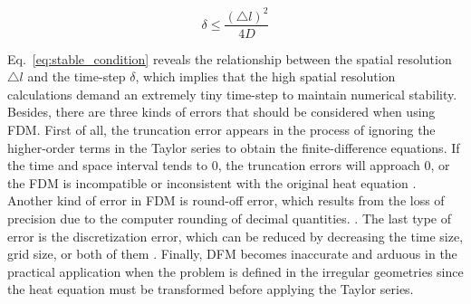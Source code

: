 \begin{equation}\label{eq:stable_condition}
  \delta \leq \frac{(\triangle l)^2}{4D}
\end{equation}

Eq.~\ref{eq:stable_condition} reveals the relationship between the
spatial resolution $\triangle l$ and the time-step $\delta$, which
implies that the high spatial resolution calculations demand an
extremely tiny time-step to maintain numerical stability. Besides,
there are three kinds of errors that should be considered when using
FDM. First of all, the truncation error appears in the process of
ignoring the higher-order terms in the Taylor series to obtain the
finite-difference equations. If the time and space interval tends to
$0$, the truncation errors will approach $0$, or the FDM is
incompatible or inconsistent with the original heat equation
\cite{crank1979mathematics}. Another kind of error in FDM is round-off
error, which results from the loss of precision due to the computer
rounding of decimal quantities. \cite{hoffman2018numerical}. The last
type of error is the discretization error, which can be reduced by
decreasing the time size, grid size, or both of them
\cite{crank1979mathematics}. Finally, DFM becomes inaccurate and
arduous in the practical application when the problem is defined in
the irregular geometries since the heat equation must be transformed
before applying the Taylor series.


